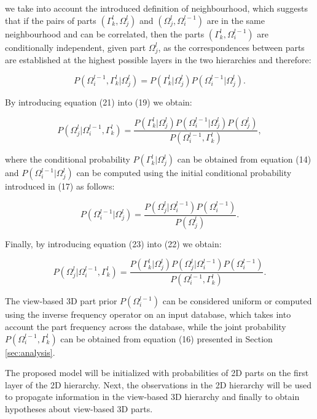 \documentclass[runningheads]{llncs}
\begin{document}
we take into account the introduced definition of neighbourhood, which suggests that if the pairs of parts $(\Gamma_k^l,\Omega_j^{l})$ and $(\Omega_j^{l},\Omega_i^{l-1})$ are in the same neighbourhood and can be correlated, then the parts $(\Gamma_k^l,\Omega_i^{l-1})$ are conditionally independent, given part $\Omega_j^{l}$, as the correspondences between parts are established at the highest possible layers in the two hierarchies and therefore: 

\begin{equation}
 P(\Omega_i^{l-1},\Gamma_k^l \vert \Omega_j^{l}) =  P(\Gamma_k^l \vert \Omega_j^{l}) P(\Omega_i^{l-1} \vert \Omega_j^{l}).
\end{equation}

By introducing equation (21) into (19) we obtain:

\begin{equation}
 P(\Omega_j^{l} \vert \Omega_i^{l-1},\Gamma_k^l) = \frac{P(\Gamma_k^l \vert \Omega_j^{l})P(\Omega_i^{l-1} \vert \Omega_j^{l})P(\Omega_j^{l})}{P(\Omega_i^{l-1},\Gamma_k^l)},
\end{equation}

where the conditional probability $P(\Gamma_k^l \vert \Omega_j^l)$ can be obtained from equation (14) and $P(\Omega_i^{l-1} \vert \Omega_j^{l})$ can be computed using the initial conditional probability introduced in (17) as follows:

\begin{equation}
 P(\Omega_i^{l-1} \vert \Omega_j^{l}) = \frac{P(\Omega_j^{l}\vert \Omega_i^{l-1})P(\Omega_i^{l-1})}{P(\Omega_j^{l})}.
 \end{equation}

Finally, by introducing equation (23) into (22) we obtain:

\begin{equation}
 P(\Omega_j^{l} \vert \Omega_i^{l-1},\Gamma_k^l) = \frac{P(\Gamma_k^l \vert \Omega_j^{l})P(\Omega_j^{l} \vert \Omega_i^{l-1})P(\Omega_i^{l-1})}{P(\Omega_i^{l-1},\Gamma_k^l)}.
\end{equation}
  
The view-based 3D part prior $P(\Omega_i^{l-1})$ can be considered uniform or computed using the inverse frequency operator on an input database, which takes into account the part frequency across the database, while the joint probability $P(\Omega_i^{l-1},\Gamma_k^l)$ can be obtained from equation (16) presented in Section \ref{sec:analysis}.

The proposed model will be initialized with probabilities of 2D parts on the first layer of the 2D hierarchy. Next, the observations in the 2D hierarchy will be used to propagate information in the view-based 3D hierarchy and finally to obtain hypotheses about view-based 3D parts. 
\end{document}
